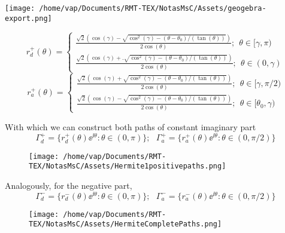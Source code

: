 \begin{multicols}{2}
		\begin{center}
					\texttt{[image: /home/vap/Documents/RMT-TEX/NotasMsC/Assets/geogebra-export.png]}
		\end{center}
	\columnbreak
	\hspace{1cm}
	\begin{equation*}
		r_d^+(\theta)  = 
		\begin{cases}
			\frac{\sqrt{2}  \left(\cos{(\gamma)}  - \sqrt{\cos^2{(\gamma)} - (\theta - \theta_0)/(\tan{(\theta)})}  \right)}{2\cos{(\theta)}}; \ \ \theta \in [\gamma, \pi ) \\
			\frac{\sqrt{2} \left(\cos{(\gamma)}  +.\sqrt{\cos^2{(\gamma)} - (\theta - \theta_0)/(\tan{(\theta)})}  \right)}{2\cos{(\theta)}}; \ \ \theta \in (0, \gamma ) 
		\end{cases}
	\end{equation*}
	\begin{equation*}
		r_a^+(\theta) = 
		\begin{cases}
			\frac{\sqrt{2}  \left(\cos{(\gamma)}  + \sqrt{\cos^2{(\gamma)} - (\theta - \theta_0)/(\tan{(\theta)})}  \right)}{2\cos{(\theta)}};  \ \ \theta \in [\gamma, \pi/2 )\\
			\frac{\sqrt{2}  \left( \cos{(\gamma)}  - \sqrt{\cos^2{(\gamma)} - (\theta - \theta_0)/(\tan{(\theta)})}  \right)}{2\cos{(\theta)}}; \ \ \theta \in [\theta_0, \gamma )
		\end{cases}
	\end{equation*}
\end{multicols}
With which we can construct both paths of constant imaginary part 
\[\Gamma_d^+ = \{ r_d^+(\theta) \ee^{\ii \theta} : \theta \in (0, \pi) \}; \ \ \ \Gamma_a^+ = \{ r_a^+(\theta) \ee^{\ii \theta} : \theta \in (0, \pi/2) \} \]
\begin{figure}[h!]
	\centering
	\texttt{[image: /home/vap/Documents/RMT-TEX/NotasMsC/Assets/Hermite1positivepaths.png]}
\end{figure}

Analogously, for the negative part,
\[\Gamma_d^- = \{ r_d^-(\theta) \ee^{\ii \theta} : \theta \in (0, \pi) \}; \ \ \ \Gamma_a^- = \{ r_a^-(\theta) \ee^{\ii \theta} : \theta \in (0, \pi/2) \} \]
\begin{figure}[h!]
	\centering
	\texttt{[image: /home/vap/Documents/RMT-TEX/NotasMsC/Assets/HermiteCompletePaths.png]}
\end{figure}

